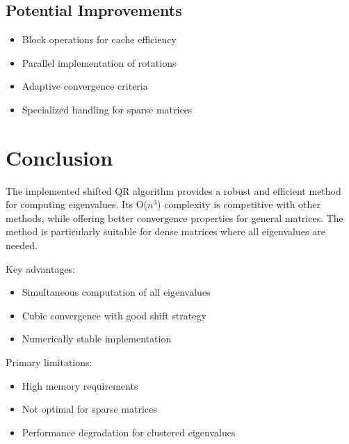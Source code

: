 \documentclass{article}
\begin{document}
\subsection{Potential Improvements}
\begin{itemize}
    \item Block operations for cache efficiency
    \item Parallel implementation of rotations
    \item Adaptive convergence criteria
    \item Specialized handling for sparse matrices
\end{itemize}

\section{Conclusion}
The implemented shifted QR algorithm provides a robust and efficient method for computing eigenvalues. Its O($n^3$) complexity is competitive with other methods, while offering better convergence properties for general matrices. The method is particularly suitable for dense matrices where all eigenvalues are needed.

Key advantages:
\begin{itemize}
    \item Simultaneous computation of all eigenvalues
    \item Cubic convergence with good shift strategy
    \item Numerically stable implementation
\end{itemize}

Primary limitations:
\begin{itemize}
    \item High memory requirements
    \item Not optimal for sparse matrices
    \item Performance degradation for clustered eigenvalues
\end{itemize}
\end{document}
